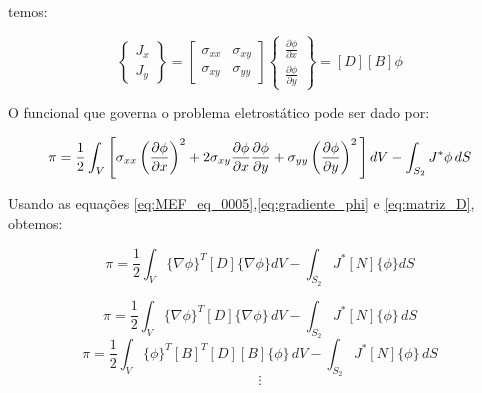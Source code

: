 \documentclass[
12pt,
a4paper,
oneside,
chapter=TITLE,
sumario=tradicional
]{abntex2}
\begin{document}
    temos:
    
    \begin{equation}
    	\begin{Bmatrix}  
    		J_x\\  
    		J_y  
    	\end{Bmatrix}
    	= \begin{bmatrix}  
    		\sigma_{xx} & \sigma_{xy}\\  
    		\sigma_{xy} & \sigma_{yy}  
    	\end{bmatrix}  
    	\begin{Bmatrix}  
    		\frac{\partial \phi}{\partial x}\\  
    		\frac{\partial \phi}{\partial y}  
    	\end{Bmatrix}=
    	[D][B]{\phi}  
    	\label{eq:matriz_D2}
    \end{equation}
    
    O funcional que governa o problema eletrostático pode ser dado por:
    
    \begin{equation}
    			\pi = \frac{1}{2}\int_V
    	\Bigg[
    	\sigma_{xx}\left(\frac{\partial \phi}{\partial x}\right)^2
    	+2\sigma_{xy}
    	\frac{\partial \phi}{\partial x}
    	\frac{\partial \phi}{\partial y}
    	\\
    	+\sigma_{yy}\left(\frac{\partial \phi}{\partial y}\right)^2
    	\Bigg]\,dV
    	-\int_{S_2}J^{*}\phi\,dS
    	\label{eq:funcional2}
    \end{equation}
    
    
    
    Usando as equações \ref{eq:MEF_eq_0005},\ref{eq:gradiente_phi} e \ref{eq:matriz_D}, obtemos:
    
    
    \begin{equation}
    	\pi = \frac{1}{2}\int_V \{ \nabla\phi \}^T[D]\{ \nabla\phi \}dV - 
    	\int_{S_2} J^*[N] \{ \phi \} dS
    	\label{eq:funcional3}
    \end{equation}
    
    
    \begin{equation}
    	\pi =
    	\frac{1}{2}
    	\int_V
    	\{\nabla \phi\}^{T}
    	[D]
    	\{\nabla \phi\}
    	\,dV
    	-
    	\int_{S_2}
    	J^{*}
    	[N]
    	\{\phi\}
    	\,dS
    \end{equation}
    \begin{equation}
    	\pi =
    	\frac{1}{2}
    	\int_V
    	\{\phi\}^{T}
    	[B]^{T}
    	[D]
    	[B]
    	\{\phi\}
    	\,dV
    	-
    	\int_{S_2}
    	J^{*}
    	[N]
    	\{\phi\}
    	\,dS
    \end{equation}
    \begin{equation*}
    \vdots
    \end{equation*}
    
\end{document}
